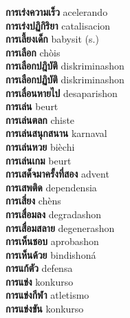 \textbf{ การเร่งความเร็ว  } acelerando \\
\textbf{ การเร่งปฏิกิริยา  } catalisacion \\
\textbf{ การเลี้ยงเด็ก  } babysit (s.) \\
\textbf{ การเลือก  } chòis \\
\textbf{ การเลือกปฎิบัติ  } diskriminashon \\
\textbf{ การเลือกปฏิบัติ  } diskriminashon \\
\textbf{ การเลื่อนหายไป  } desaparishon \\
\textbf{ การเล่น  } beurt \\
\textbf{ การเล่นตลก  } chiste \\
\textbf{ การเล่นสนุกสนาน  } karnaval \\
\textbf{ การเล่นหวย  } bièchi \\
\textbf{ การเล่นเกม  } beurt \\
\textbf{ การเสด็จมาครั้งที่สอง  } advent \\
\textbf{ การเสพติด  } dependensia \\
\textbf{ การเสี่ยง  } chèns \\
\textbf{ การเสื่อมลง  } degradashon \\
\textbf{ การเสื่อมสลาย  } degenerashon \\
\textbf{ การเห็นชอบ  } aprobashon \\
\textbf{ การเห็นด้วย  } bindishoná \\
\textbf{ การแก้ตัว  } defensa \\
\textbf{ การแข่ง  } konkurso \\
\textbf{ การแข่งกีฬา  } atletismo \\
\textbf{ การแข่งขัน  } konkurso \\

